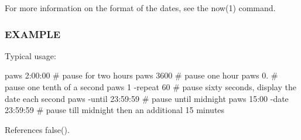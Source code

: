 For more information on the format of the dates, see the now(1) command.

\subsubsection*{E\+X\+A\+M\+P\+LE}

Typical usage\+:

paws 2\+:00\+:00 \# pause for two hours paws 3600 \# pause one hour paws 0. \# pause one tenth of a second paws 1 -\/repeat 60 \# pause sixty seconds, display the date each second paws -\/until 23\+:59\+:59 \# pause until midnight paws 15\+:00 -\/date 23\+:59\+:59 \# pause till midnight then an additional 15 minutes 

References false().

